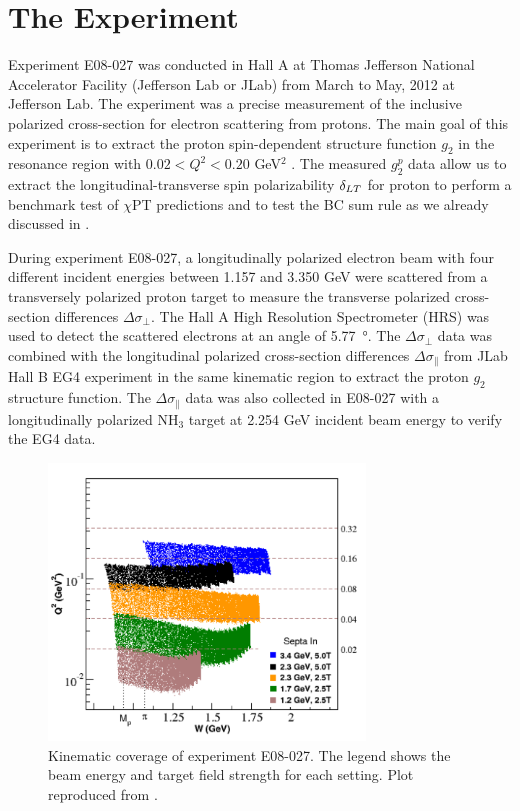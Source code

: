 
\chapter{The Experiment}
\label{C5}

Experiment E08-027 was conducted in Hall A at Thomas Jefferson National Accelerator Facility (Jefferson Lab or JLab) from March to May, 2012 at Jefferson Lab. The experiment was a precise measurement of the inclusive polarized cross-section for electron scattering from protons. The main goal of this experiment is to extract the proton spin-dependent structure function $g_2$ in the resonance region with $0.02<Q^2<0.20$ GeV${}^2$ \cite{G2P}. The measured $g_2^p$ data allow us to extract the longitudinal-transverse spin polarizability $\delta_{LT}$ for proton to perform a benchmark test of $\chi$PT predictions and to test the BC sum rule as we already discussed in .

During experiment E08-027, a longitudinally polarized electron beam with four different incident energies between 1.157 and 3.350 GeV were scattered from a transversely polarized proton target to measure the transverse polarized cross-section differences $\Delta\sigma_\perp$. The Hall A High Resolution Spectrometer (HRS) was used to detect the scattered electrons at an angle of \SI{5.77}{\degree}. The $\Delta\sigma_\perp$ data was combined with the longitudinal polarized cross-section differences $\Delta\sigma_\parallel$ from JLab Hall B EG4 experiment in the same kinematic region to extract the proton $g_2$ structure function. The $\Delta\sigma_\parallel$ data was also collected in E08-027 with a longitudinally polarized NH${}_3$ target at 2.254 GeV incident beam energy to verify the EG4 data.

\begin{figure}[tb!]
  \centering
  \includegraphics[width=0.75\textwidth]{figs/kinematics-g2p.png}
  \caption[Kinematic coverage of experiment E08-027.]{Kinematic coverage of experiment E08-027. The legend shows the beam energy and target field strength for each setting. Plot reproduced from \cite{G2P}. \label{C5F1}}
\end{figure}

